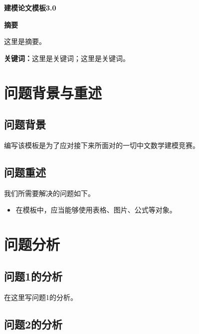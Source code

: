 \documentclass[12pt, a4paper, oneside]{ctexart}
\begin{document}
\pagestyle{empty}
\setcounter{page}{0}

\begin{center}
    \Large{\textbf{建模论文模板3.0}}
\end{center}

\begin{center}
    \Large{\textbf{摘要}}
\end{center}

这里是摘要。

\textbf{关键词：}这里是关键词；这里是关键词。

\newpage
\setcounter{page}{1}
\pagestyle{plain}
\fancyfoot[C]{\thepage}

\section{问题背景与重述}

\subsection{问题背景}

编写该模板是为了应对接下来所面对的一切中文数学建模竞赛。


\subsection{问题重述}

我们所需要解决的问题如下。
\begin{itemize}
    \item 在模板中，应当能够使用表格、图片、公式等对象。
\end{itemize}

\section{问题分析}

\subsection{问题1的分析}

在这里写问题1的分析。

\subsection{问题2的分析}
\end{document}
